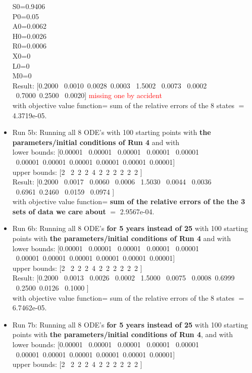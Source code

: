 \documentclass[12pt]{article}
\begin{document}
\begin{itemize}
S0=0.9406 \\
P0=0.05 \\
A0=0.0062 \\
H0=0.0026 \\
R0=0.0006 \\
X0=0 \\
L0=0 \\
M0=0 \\




Result: [0.2000  \  0.0010\    0.0028\    0.0003   \ 1.5002 \   0.0073 \   0.0002 \   0.7000\    0.2500  \  0.0020] \textcolor{red}{missing one by accident} \\
with objective value function= sum of the relative errors of the 8 states $=$  4.3719e-05. 




\item Run 5b:  Running all 8 ODE's with 100 starting points with \textbf{the parameters/initial conditions of Run 4} and with \\
lower bounds: [0.00001 \ 0.00001 \ 0.00001 \ 0.00001 \ 0.00001 \ 0.00001\ 0.00001\ 0.00001\ 0.00001\ 0.00001\ 0.00001] \\
upper bounds: [2 \ 2\  2\  2\  4\  2\  2\  2\  2\  2\  2 ] \\

Result: [0.2000 \    0.0017  \  0.0060   \ 0.0006  \  1.5030  \  0.0044 \   0.0036  \  0.6961\    0.2460  \ 0.0159  \  0.0974 ] \\
with objective value function= \textbf{sum of the relative errors of the the 3 sets of data we care about} $=$ 2.9567e-04.

\item Run 6b: Running all 8 ODE's \textbf{for 5 years instead of 25} with 100 starting points with \textbf{the parameters/initial conditions of Run 4} and with \\
lower bounds: [0.00001 \ 0.00001 \ 0.00001 \ 0.00001 \ 0.00001 \ 0.00001\ 0.00001\ 0.00001\ 0.00001\ 0.00001\ 0.00001] \\
upper bounds: [2 \ 2\  2\  2\  4\  2\  2\  2\  2\  2\  2 ] \\

Result: [0.2000   \ 0.0013    \ 0.0026  \  0.0002  \  1.5000  \  0.0075  \  0.0008\    0.6999 \   0.2500\
     0.0126   \ 0.1000 ] \\
with objective value function= sum of the relative errors of the 8 states $=$  6.7462e-05. 

\item Run 7b: Running all 8 ODE's \textbf{for 5 years instead of 25} with 100 starting points with \textbf{the parameters/initial conditions of Run 4},  and with \\
lower bounds: [0.00001 \ 0.00001 \ 0.00001 \ 0.00001 \ 0.00001 \ 0.00001\ 0.00001\ 0.00001\ 0.00001\ 0.00001\ 0.00001] \\
upper bounds: [2 \ 2\  2\  2\  4\  2\  2\  2\  2\  2\  2 ] \\


\end{itemize}
\end{document}

